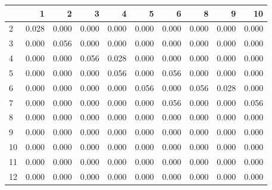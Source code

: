 \documentclass[]{book}
\newenvironment{Shaded}{\begin{snugshade}}{\end{snugshade}}
\newcommand{\DataTypeTok}[1]{\textcolor[rgb]{0.13,0.29,0.53}{#1}}
\newcommand{\DecValTok}[1]{\textcolor[rgb]{0.00,0.00,0.81}{#1}}
\newcommand{\KeywordTok}[1]{\textcolor[rgb]{0.13,0.29,0.53}{\textbf{#1}}}
\newcommand{\NormalTok}[1]{#1}
\newcommand{\OperatorTok}[1]{\textcolor[rgb]{0.81,0.36,0.00}{\textbf{#1}}}
\begin{document}
\begin{Shaded}
\end{Shaded}

\begin{tabular}{l|r|r|r|r|r|r|r|r|r}
\hline
  & 1 & 2 & 3 & 4 & 5 & 6 & 8 & 9 & 10\\
\hline
2 & 0.028 & 0.000 & 0.000 & 0.000 & 0.000 & 0.000 & 0.000 & 0.000 & 0.000\\
\hline
3 & 0.000 & 0.056 & 0.000 & 0.000 & 0.000 & 0.000 & 0.000 & 0.000 & 0.000\\
\hline
4 & 0.000 & 0.000 & 0.056 & 0.028 & 0.000 & 0.000 & 0.000 & 0.000 & 0.000\\
\hline
5 & 0.000 & 0.000 & 0.000 & 0.056 & 0.000 & 0.056 & 0.000 & 0.000 & 0.000\\
\hline
6 & 0.000 & 0.000 & 0.000 & 0.000 & 0.056 & 0.000 & 0.056 & 0.028 & 0.000\\
\hline
7 & 0.000 & 0.000 & 0.000 & 0.000 & 0.000 & 0.056 & 0.000 & 0.000 & 0.056\\
\hline
8 & 0.000 & 0.000 & 0.000 & 0.000 & 0.000 & 0.000 & 0.000 & 0.000 & 0.000\\
\hline
9 & 0.000 & 0.000 & 0.000 & 0.000 & 0.000 & 0.000 & 0.000 & 0.000 & 0.000\\
\hline
10 & 0.000 & 0.000 & 0.000 & 0.000 & 0.000 & 0.000 & 0.000 & 0.000 & 0.000\\
\hline
11 & 0.000 & 0.000 & 0.000 & 0.000 & 0.000 & 0.000 & 0.000 & 0.000 & 0.000\\
\hline
12 & 0.000 & 0.000 & 0.000 & 0.000 & 0.000 & 0.000 & 0.000 & 0.000 & 0.000\\
\hline
\end{tabular}
\end{document}
